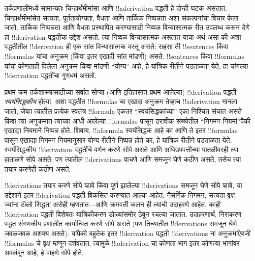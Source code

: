 \documentclass[../../../include/open-logic-section]{subfiles}
\begin{document}
      {}
      {}


तर्कप्रणालींमध्ये सामान्यतः चिन्हार्थमीमांसा आणि !!a{derivation}
पद्धती हे दोन्ही घटक असतात. चिन्हार्थमीमांसेत सत्यता, पूर्ततायोग्यता,
वैधता आणि तार्किक निष्पन्नता अशा संकल्पनांचा विचार केला जातो.
तार्किक निष्पन्नता आणि वैधता प्रस्थापित करण्यासाठी निव्वळ विन्यासात्मक
रीत उपलब्ध करून देणे हा !!{derivation} पद्धतींचा उद्देश असतो. त्या
निव्वळ विन्यासात्मक असतात याचा अर्थ असा की अशा पद्धतीतील
!!{derivation} ही एक सांत विन्यासात्मक वस्तू असते; सहसा ती
!!{sentence}s किंवा !!{formula}s यांचा अनुक्रम (किंवा इतर एखादी सांत
मांडणी) असते. !!{sentence}s किंवा !!{formula}s यांचा कोणताही दिलेला
अनुक्रम किंवा मांडणी ``योग्य'' आहे, हे यांत्रिक रीतीने पडताळता येते,
हा चांगल्या !!{derivation} पद्धतींचा गुणधर्म असतो.

प्रथम-क्रम तर्कशास्त्रासाठीच्या सर्वांत सोप्या (आणि इतिहासात प्रथम
आलेल्या) !!{derivation} पद्धती \emph{स्वयंसिद्धकीय} होत्या. अशा
पद्धतीत !!{formula}s चा एखादा अनुक्रम तेव्हाच !!a{derivation} मानला
जातो, जेव्हा त्यातील प्रत्येक स्वतंत्र !!{formula} एकतर
``स्वयंसिद्धकांच्या'' एका निश्चित संचात असते किंवा त्या अनुक्रमात
त्याच्या आधी आलेल्या !!{formula}s पासून ठरावीक संख्येतील ``निगमन
नियमां''पैकी एखाद्या नियमाने निष्पन्न होते. शिवाय, !!a{formula}
स्वयंसिद्धक आहे का आणि ते इतर !!{formula}s पासून एखाद्या निगमन
नियमानुसार योग्य रीतीने निष्पन्न होते का, हे यांत्रिक रीतीने पडताळता
येते. स्वयंसिद्धकीय !!{derivation} पद्धतींचे वर्णन करणे सोपे असते आणि
अधिउपपत्तीच्या पातळीवरही त्या हाताळणे सोपे असते; पण त्यांतील
!!{derivation}s वाचणे आणि समजून घेणे कठीण असते, तसेच त्या तयार करणेही
कठीण असते.

!!{derivation}s तयार करणे सोपे व्हावे किंवा पूर्ण झालेल्या
!!{derivation}s समजून घेणे सोपे व्हावे, या उद्देशाने इतर
!!{derivation} पद्धती विकसित करण्यात आल्या आहेत. नैसर्गिक निगमन,
सत्यता-वृक्ष---ज्यांना टॅब्लो सिद्धता असेही म्हणतात---आणि क्रमवर्ती कलन
ही त्यांची उदाहरणे आहेत. काही !!{derivation} पद्धती विशेषतः
यांत्रिकीकरण डोळ्यांसमोर ठेवून रचल्या जातात. उदाहरणार्थ, निराकरण पद्धत
संगणकीय प्रणालीत कार्यान्वित करणे सोपे असते (पण तिच्यातील
!!{derivation}s समजून घेणे जवळजवळ अशक्य असते). यांपैकी बहुतेक इतर
!!{derivation} पद्धती !!{derivation}s ना अनुक्रमांऐवजी !!{formula}s चे
वृक्ष म्हणून दर्शवतात. त्यामुळे !!a{derivation} चा कोणता भाग इतर
कोणत्या भागांवर अवलंबून आहे, हे पाहणे सोपे होते.
\end{document}
